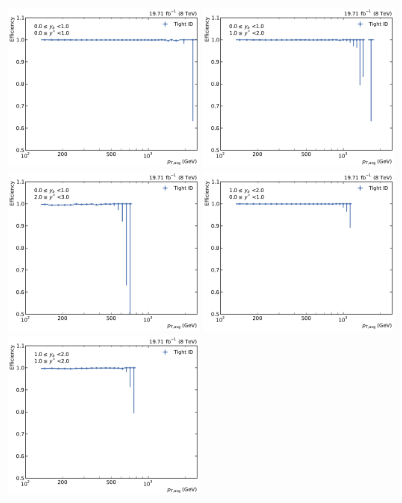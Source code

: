\begin{figure}[htbp]
    \centering
    \includegraphics[width=0.45\textwidth]{figures/measurement/jetideff_yb0ys0.pdf}\hfill
    \includegraphics[width=0.45\textwidth]{figures/measurement/jetideff_yb0ys1.pdf}
    \includegraphics[width=0.45\textwidth]{figures/measurement/jetideff_yb0ys2.pdf}\hfill
    \includegraphics[width=0.45\textwidth]{figures/measurement/jetideff_yb1ys0.pdf}
    \includegraphics[width=0.45\textwidth]{figures/measurement/jetideff_yb1ys1.pdf}\hfill

\end{figure}

